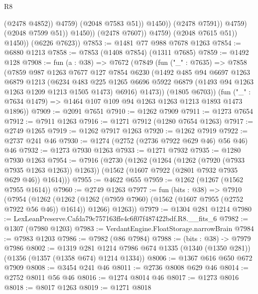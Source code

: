 \begin{lexlean}{R8}
\begin{coremodule}
                                    (@2478 @4852))
                                  @4759)
                                (@2048 @7583 @51))
                              @1450))
                          (@2478 @7591))
                        @4759)
                      (@2048 @7599 @51))
                    @1450))
                (@2478 @7607))
              @4759)
            (@2048 @7615 @51))
          @1450))
      (@6226 @7623))
@7853 := @1481 @77 @988 @7678 @1263
@7854 := @6880 @1213
@7858 := @7853 (@1408 @7854) (@1311 @7685)
@7859 := @1492 @128
@7908 := fun (a : @38) =>
  @7672
    (@7849
      (fun ("_" : @7635) =>
      @7858
        (@7859
          @987
          @1263
          @7677
          @127
          @7854
          @6230
          (@1492
            @485
            @94
            @6697
            @1263
            @6879
            @1213
            (@6234
              @483
              @225
              @1265
              @6696
              @5922
              @6879
              (@1493 @94 @1263 @1263 @1209 @1213 @1505 @1473)
              @6916)
            @1473))
        (@1805 @6703))
      (fun ("_" : @7634 @1479) => @1464 @107 @109 @94 @1263 @1263 @1213 @1893 @1473 @1896))
@7909 := @2091 @7651
@7910 := @1262 @7909
@7911 := @1273 @7654
@7912 := @7911 @1263
@7916 := @1271 @7912 (@1280 @7654 @1263)
@7917 := @2749 @1265
@7919 := @1262 @7917 @1263
@7920 := @1262 @7919
@7922 := @2737 @241 @46
@7930 := @1274 (@2752 (@2736 @7922 @629 @46) @56 @46) @46
@7932 := @1273 @7930 @1263
@7933 := @1271 @7932
@7935 := @1280 @7930 @1263
@7954 := @7916
    (@2730
      (@1262
        (@1264 (@1262 (@7920 (@7933 @7935 @1263 @1263)) @1263))
        (@1562 (@1607 @7922 (@2801 @7932 @7935 @629 @46)) @1614)))
@7955 := @4622 @655
@7959 := @1262 (@1267 (@1562 @7955 @1614))
@7960 := @2749 @1263
@7977 := fun (bits : @38) =>
  @7910
    (@7954
      (@1262
        (@1262 (@1262 (@7959 @7960) (@1562 (@1607 @7955 (@2752 @7922 @56 @46)) @1614)) @1266)
        @1263))
@7979 := @1304 @281 @1214
@7980 := LexLeanPreserve.Cafda79c757163ffe4c6f07f487422bdf.R8.__fits_6
@7982 := @1307 (@7980 @1203)
@7983 := VerdantEngine.FloatStorage.narrowBrain
@7984 := @7983 @1203
@7986 := @7982 (@86 @7984)
@7988 := (bits : @38) -> @7979 @7986
@8002 := @1319
    @281
    @1214
    @7986
    @674
    @1335
    (@1340 (@1350 @281))
    (@1356 (@1357 (@1358 @674) @1214 @1334))
@8006 := @1367 @616 @650 @672 @7909
@8008 := @3454 @241 @46
@8011 := @2736 @8008 @629 @46
@8014 := @2752 @8011 @56 @46
@8016 := @1274 @8014 @46
@8017 := @1273 @8016
@8018 := @8017 @1263
@8019 := @1271 @8018

\end{coremodule}
\end{lexlean}
